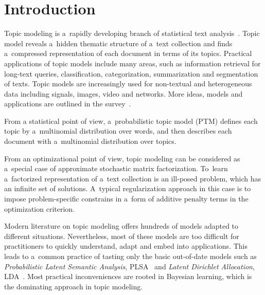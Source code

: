 \documentclass{sig-alternate}
\begin{document}

\section{Introduction}

Topic modeling is a~rapidly developing branch of statistical text analysis~\cite{blei12ptm}.
Topic model reveals a~hidden thematic structure of a~text collection
and finds a~compressed representation of each document in terms of its topics.
Practical applications of topic models include many areas, such as
information retrieval for long-text queries,
classification, categorization, summarization and segmentation of texts.
Topic models are increasingly used for non-textual and heterogeneous data
including signals, images, video and networks.
More ideas, models and applications are outlined in the survey~\cite{daud10knowledge}.

From a statistical point of view, a~probabilistic topic model (PTM)
defines each topic by a~multinomial distribution over words,
and then describes each document with a~multinomial distribution over topics.

From an optimizational point of view,
topic modeling can be considered as a~special case
of approximate stochastic matrix factorization.
To~learn a~factorized representation of a~text collection
is an ill-posed problem, which has an infinite set of solutions.
A~typical regularization approach in this case is
to impose problem-specific constrains
in a~form of additive penalty terms in the optimization criterion.

Modern literature on topic modeling offers hundreds of models adapted to different situations.
Nevertheless,
most of these models are too difficult for practitioners
to quickly understand, adapt and embed into applications.
This leads to a~common practice of tasting only the basic out-of-date models such as
\emph{Probabilistic Latent Semantic Analysis}, PLSA~\cite{hofmann99plsi} and
\emph{Latent Dirichlet Allocation}, LDA~\cite{blei03latent}.
Most practical inconveniences are rooted in Bayesian learning,
which is the dominating approach in topic modeling.
\end{document}
